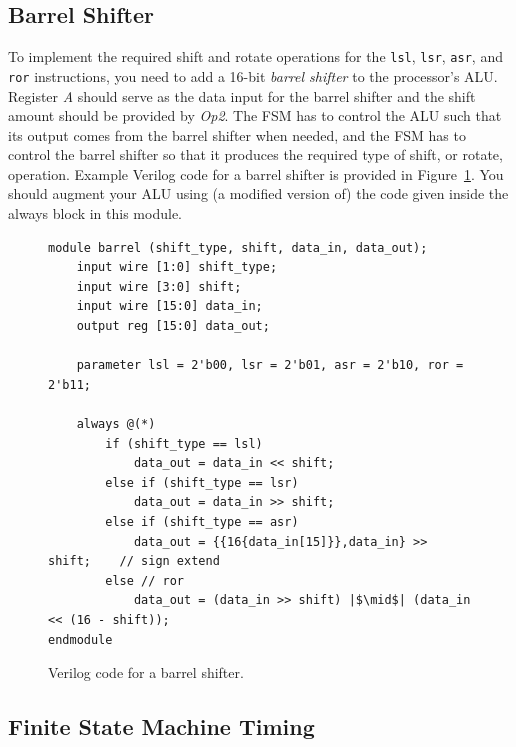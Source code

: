 \documentclass[epsfig,10pt,fullpage]{article} \addtolength{\textwidth}{1.5in}
\begin{document}
\subsection*{Barrel Shifter}

To implement the required shift and rotate operations for the \texttt{lsl}, \texttt{lsr},
\texttt{asr}, and \texttt{ror} instructions, you need to add a 16-bit {\it barrel shifter} to the
processor's ALU. Register {\it A} should serve as the data input for the barrel shifter and
the shift amount should be provided by {\it Op2}. The FSM has to control the ALU such that
its output comes from the barrel shifter when needed, and the FSM has to control the
barrel shifter so that it produces the required type of shift, or rotate, operation. Example 
Verilog code for a barrel shifter is provided in Figure~\ref{fig:barrel}. You should augment 
your ALU using (a modified version of) the code given inside the always block in this module.

\lstset{language=Verilog,numbers=none,escapechar=|}
\begin{figure}[h]
\begin{center}
\begin{minipage}[h]{15 cm}
\begin{lstlisting}[]
module barrel (shift_type, shift, data_in, data_out);
    input wire [1:0] shift_type;
    input wire [3:0] shift;
    input wire [15:0] data_in;
    output reg [15:0] data_out;

    parameter lsl = 2'b00, lsr = 2'b01, asr = 2'b10, ror = 2'b11;

    always @(*)
        if (shift_type == lsl)
            data_out = data_in << shift;
        else if (shift_type == lsr) 
            data_out = data_in >> shift;
        else if (shift_type == asr) 
            data_out = {{16{data_in[15]}},data_in} >> shift;    // sign extend
        else // ror
            data_out = (data_in >> shift) |$\mid$| (data_in << (16 - shift));
endmodule
\end{lstlisting}
\end{minipage}
\caption{Verilog code for a barrel shifter.}
\label{fig:barrel}
\end{center}
\end{figure}

\subsection*{Finite State Machine Timing}
\end{document}
